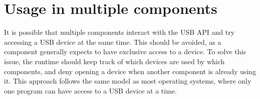 \section{Usage in multiple components}
\label{section:usage_in_multiple_components}
It is possible that multiple components interact with the \acrshort{USB} \acrshort{API} and try accessing a \acrshort{USB} device at the same time. This should be avoided, as a component generally expects to have exclusive access to a device. To solve this issue, the runtime should keep track of which devices are used by which components, and deny opening a device when another component is already using it. This approach follows the same model as most operating systems, where only one program can have access to a \acrshort{USB} device at a time.